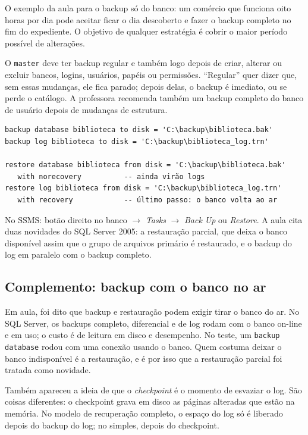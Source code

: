 O exemplo da aula para o backup só do banco: um comércio que funciona
oito horas por dia pode aceitar ficar o dia descoberto e fazer o backup
completo no fim do expediente. O objetivo de qualquer estratégia é
cobrir o maior período possível de alterações.

O \texttt{master} deve ter backup regular e também logo depois de criar,
alterar ou excluir bancos, logins, usuários, papéis ou permissões.
``Regular'' quer dizer que, sem essas mudanças, ele fica parado; depois
delas, o backup é imediato, ou se perde o catálogo. A professora
recomenda também um backup completo do banco de usuário depois de
mudanças de estrutura.

\begin{lstlisting}
backup database biblioteca to disk = 'C:\backup\biblioteca.bak'
backup log biblioteca to disk = 'C:\backup\biblioteca_log.trn'

restore database biblioteca from disk = 'C:\backup\biblioteca.bak'
   with norecovery          -- ainda virão logs
restore log biblioteca from disk = 'C:\backup\biblioteca_log.trn'
   with recovery            -- último passo: o banco volta ao ar
\end{lstlisting}

No SSMS: botão direito no banco $\rightarrow$ \emph{Tasks} $\rightarrow$
\emph{Back Up} ou \emph{Restore}. A aula cita duas novidades do SQL Server
2005: a restauração parcial, que deixa o banco disponível assim que o
grupo de arquivos primário é restaurado, e o backup do log em paralelo
com o backup completo.

\subsection*{Complemento: backup com o banco no ar}

Em aula, foi dito que backup e restauração podem exigir tirar o banco do
ar. No SQL Server, os backups completo, diferencial e de log rodam com o
banco on-line e em uso; o custo é de leitura em disco e desempenho. No
teste, um \texttt{backup database} rodou com uma conexão usando o
banco. Quem costuma deixar o banco indisponível é a restauração, e é por
isso que a restauração parcial foi tratada como novidade.

Também apareceu a ideia de que o \emph{checkpoint} é o momento de
esvaziar o log. São coisas diferentes: o checkpoint grava em disco as
páginas alteradas que estão na memória. No modelo de recuperação
completo, o espaço do log só é liberado depois do backup do log; no
simples, depois do checkpoint.

